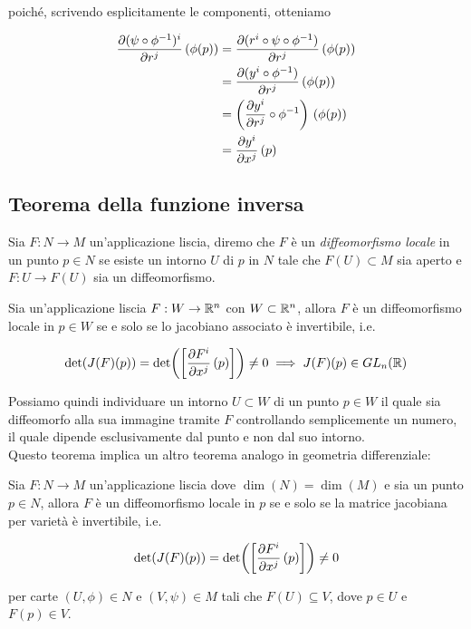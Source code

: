 poiché, scrivendo esplicitamente le componenti, otteniamo

\begin{align}
	\begin{split}
		\pdv{(\psi \circ \phi^{-1})^{i}}{r^{j}} \, (\phi(p)) &= \pdv{(r^{i} \circ \psi \circ \phi^{-1})}{r^{j}} \, (\phi(p))\\
		&= \pdv{(y^{i} \circ \phi^{-1})}{r^{j}} \, (\phi(p))\\
		&= \left( \pdv{y^{i}}{r^{j}} \circ \phi^{-1} \right) \, (\phi(p))\\
		&= \pdv{y^{i}}{x^{j}} \, (p)
	\end{split}
\end{align}

\subsection{Teorema della funzione inversa}

Sia $ F : N \to M $ un'applicazione liscia, diremo che $ F $ è un \textit{diffeomorfismo locale} in un punto $ p \in N $ se esiste un intorno $ U $ di $ p $ in $ N $ tale che $ F(U) \subset M $ sia aperto e $ F : U \to F(U) $ sia un diffeomorfismo.

\begin{theorem}
	Sia un'applicazione liscia $ F : W \to \mathbb{R}^{n} $ con $ W \subset \mathbb{R}^{n} $, allora $ F $ è un diffeomorfismo locale in $ p \in W $ se e solo se lo jacobiano associato è invertibile, i.e.
	
	\begin{equation}
		\det(J(F)(p)) = \det( \left[ \pdv{F^{i}}{x^{j}} \, (p) \right] ) \neq 0 %
		\implies %
		J(F)(p) \in GL_{n} (\R)
	\end{equation}
\end{theorem}

Possiamo quindi individuare un intorno $ U \subset W $ di un punto $ p \in W $ il quale sia diffeomorfo alla sua immagine tramite $ F $ controllando semplicemente un numero, il quale dipende esclusivamente dal punto e non dal suo intorno.\\
Questo teorema implica un altro teorema analogo in geometria differenziale:

\begin{theorem}\label{ift}
	Sia $ F : N \to M $ un'applicazione liscia dove $ \dim(N) = \dim(M) $ e sia un punto $ p \in N $, allora $ F $ è un diffeomorfismo locale in $ p $ se e solo se la matrice jacobiana per varietà è invertibile, i.e.
	
	\begin{equation}
		\det(J(F)(p)) = \det( \left[ \pdv{F^{i}}{x^{j}} \, (p) \right] ) \neq 0
	\end{equation}
	
	per carte $ (U,\phi) \in N $ e $ (V,\psi) \in M $ tali che $ F(U) \subseteq V $, dove $ p \in U $ e $ F(p) \in V $.
\end{theorem}

